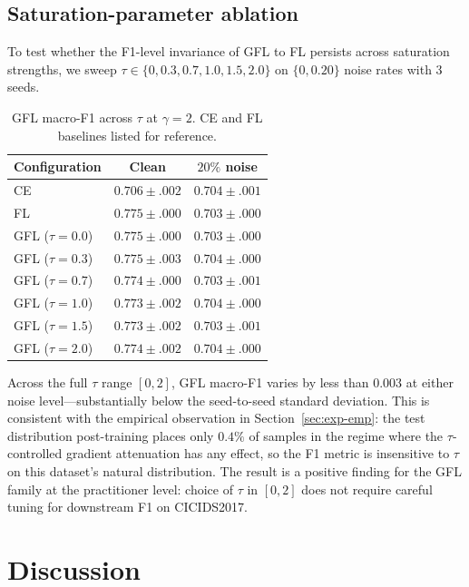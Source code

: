 \documentclass[conference]{IEEEtran}
\theoremstyle{definition}
\begin{document}
\subsection{Saturation-parameter ablation}
\label{sec:exp-tau}

To test whether the F1-level invariance of GFL to FL persists across saturation strengths, we sweep $\tau \in \{0, 0.3, 0.7, 1.0, 1.5, 2.0\}$ on $\{0, 0.20\}$ noise rates with $3$ seeds.

\begin{table}[t]
\caption{GFL macro-F1 across $\tau$ at $\gamma = 2$. CE and FL baselines listed for reference.}
\label{tab:tau-ablation}
\centering
\small
\begin{tabular}{lcc}
\toprule
Configuration & Clean & $20\%$ noise \\
\midrule
CE              & $0.706 \pm .002$ & $0.704 \pm .001$ \\
FL              & $0.775 \pm .000$ & $0.703 \pm .000$ \\
\midrule
GFL ($\tau{=}0.0$)  & $0.775 \pm .000$ & $0.703 \pm .000$ \\
GFL ($\tau{=}0.3$)  & $0.775 \pm .003$ & $0.704 \pm .000$ \\
GFL ($\tau{=}0.7$)  & $0.774 \pm .000$ & $0.703 \pm .001$ \\
GFL ($\tau{=}1.0$)  & $0.773 \pm .002$ & $0.704 \pm .000$ \\
GFL ($\tau{=}1.5$)  & $0.773 \pm .002$ & $0.703 \pm .001$ \\
GFL ($\tau{=}2.0$)  & $0.774 \pm .002$ & $0.704 \pm .000$ \\
\bottomrule
\end{tabular}
\end{table}

Across the full $\tau$ range $[0, 2]$, GFL macro-F1 varies by less than $0.003$ at either noise level---substantially below the seed-to-seed standard deviation. This is consistent with the empirical observation in Section~\ref{sec:exp-emp}: the test distribution post-training places only $0.4\%$ of samples in the regime where the $\tau$-controlled gradient attenuation has any effect, so the F1 metric is insensitive to $\tau$ on this dataset's natural distribution. The result is a positive finding for the GFL family at the practitioner level: choice of $\tau$ in $[0, 2]$ does not require careful tuning for downstream F1 on CICIDS2017.

\section{Discussion}
\label{sec:discussion}
\end{document}
